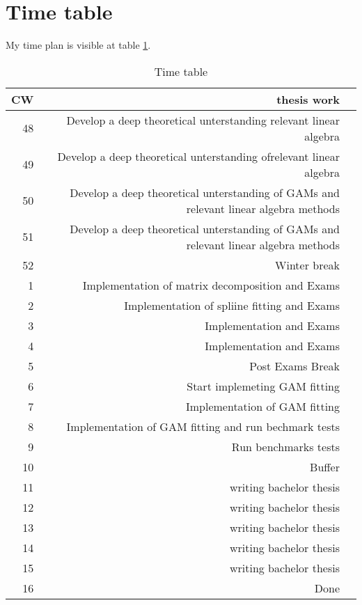 \documentclass{article}
\begin{document}
    \section{Time table}
    My time plan is visible at table \ref{timetable}.
    \begin{table}[h]
        \begin{center}
        \caption{Time table} %
        \label{timetable}
        \begin{tabular}{rrl}
            \toprule
            CW & thesis work \\
            \midrule
            48  & Develop a deep theoretical unterstanding relevant linear algebra  \\
            49  & Develop a deep theoretical unterstanding ofrelevant linear algebra  \\
            50  & Develop a deep theoretical unterstanding of GAMs and relevant linear algebra methods  \\
            51  & Develop a deep theoretical unterstanding of GAMs and relevant linear algebra methods  \\
            52  & Winter break \\
            1  & Implementation of matrix decomposition and Exams \\
            2  & Implementation of spliine fitting and Exams \\
            3  & Implementation and Exams \\
            4  & Implementation and Exams \\
            5  & Post Exams Break \\
            6  & Start implemeting GAM fitting \\
            7  & Implementation of GAM fitting \\
            8  & Implementation of GAM fitting and run bechmark tests \\
            9  & Run benchmarks tests  \\
            10  & Buffer \\
            11  & writing bachelor thesis\\
            12  & writing bachelor thesis\\
            13  & writing bachelor thesis\\
            14  & writing bachelor thesis\\
            15  & writing bachelor thesis\\
            16  & Done \\



        \end{tabular}
        \end{center}
    \end{table}
    \newpage


    \newpage
\end{document}
